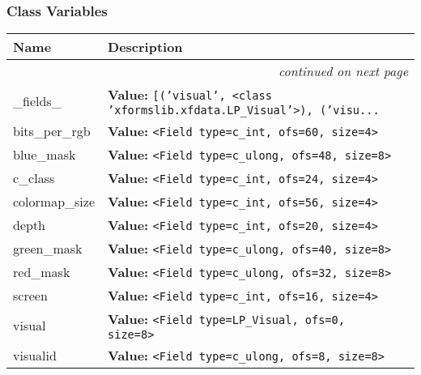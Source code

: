 
  \subsubsection{Class Variables}

    \vspace{-1cm}
\hspace{\varindent}\begin{longtable}{|p{\varnamewidth}|p{\vardescrwidth}|l}
\cline{1-2}
\cline{1-2} \centering \textbf{Name} & \centering \textbf{Description}& \\
\cline{1-2}
\endhead\cline{1-2}\multicolumn{3}{r}{\small\textit{continued on next page}}\\\endfoot\cline{1-2}
\endlastfoot\raggedright \_\-f\-i\-e\-l\-d\-s\-\_\- & \raggedright \textbf{Value:} 
{\tt \texttt{[}\texttt{(}\texttt{'}\texttt{visual}\texttt{'}\texttt{, }{\textless}class 'xformslib.xfdata.LP\_Visual'{\textgreater}\texttt{)}\texttt{, }\texttt{(}\texttt{'}\texttt{visu}\texttt{...}}&\\
\cline{1-2}
\raggedright b\-i\-t\-s\-\_\-p\-e\-r\-\_\-r\-g\-b\- & \raggedright \textbf{Value:} 
{\tt {\textless}Field type=c\_int, ofs=60, size=4{\textgreater}}&\\
\cline{1-2}
\raggedright b\-l\-u\-e\-\_\-m\-a\-s\-k\- & \raggedright \textbf{Value:} 
{\tt {\textless}Field type=c\_ulong, ofs=48, size=8{\textgreater}}&\\
\cline{1-2}
\raggedright c\-\_\-c\-l\-a\-s\-s\- & \raggedright \textbf{Value:} 
{\tt {\textless}Field type=c\_int, ofs=24, size=4{\textgreater}}&\\
\cline{1-2}
\raggedright c\-o\-l\-o\-r\-m\-a\-p\-\_\-s\-i\-z\-e\- & \raggedright \textbf{Value:} 
{\tt {\textless}Field type=c\_int, ofs=56, size=4{\textgreater}}&\\
\cline{1-2}
\raggedright d\-e\-p\-t\-h\- & \raggedright \textbf{Value:} 
{\tt {\textless}Field type=c\_int, ofs=20, size=4{\textgreater}}&\\
\cline{1-2}
\raggedright g\-r\-e\-e\-n\-\_\-m\-a\-s\-k\- & \raggedright \textbf{Value:} 
{\tt {\textless}Field type=c\_ulong, ofs=40, size=8{\textgreater}}&\\
\cline{1-2}
\raggedright r\-e\-d\-\_\-m\-a\-s\-k\- & \raggedright \textbf{Value:} 
{\tt {\textless}Field type=c\_ulong, ofs=32, size=8{\textgreater}}&\\
\cline{1-2}
\raggedright s\-c\-r\-e\-e\-n\- & \raggedright \textbf{Value:} 
{\tt {\textless}Field type=c\_int, ofs=16, size=4{\textgreater}}&\\
\cline{1-2}
\raggedright v\-i\-s\-u\-a\-l\- & \raggedright \textbf{Value:} 
{\tt {\textless}Field type=LP\_Visual, ofs=0, size=8{\textgreater}}&\\
\cline{1-2}
\raggedright v\-i\-s\-u\-a\-l\-i\-d\- & \raggedright \textbf{Value:} 
{\tt {\textless}Field type=c\_ulong, ofs=8, size=8{\textgreater}}&\\
\cline{1-2}
\end{longtable}

